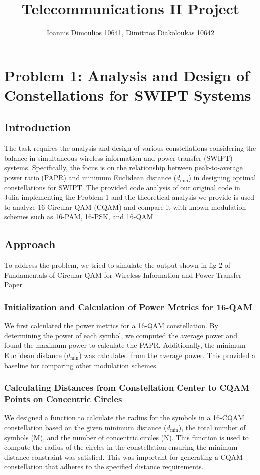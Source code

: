 \documentclass[11pt,a4paper,oneside]{article}
\title{Telecommunications II Project}
\author{Ioannis Dimoulios 10641, Dimitrios Diakoloukas 10642}
\begin{document}
\maketitle

\section{Problem 1: Analysis and Design of Constellations for SWIPT Systems}

\subsection{Introduction}
The task requires the analysis and design of various constellations considering the
balance in simultaneous wireless information and power transfer (SWIPT) systems.
Specifically, the focus is on the relationship between peak-to-average power ratio (PAPR)
and minimum Euclidean distance ($d_{\text{min}}$) in designing optimal constellations for SWIPT.
The provided code analysis of our original code in Julia implementing the Problem 1 and the theoretical
analysis we provide is used to analyze 16-Circular QAM (CQAM) and compare it with known modulation schemes such as 16-PAM, 16-PSK, and 16-QAM.

\subsection{Approach}
To address the problem, we tried to simulate the output shown in fig 2 of Fundamentals
of Circular QAM for Wireless Information and Power Transfer Paper

\subsubsection{Initialization and Calculation of Power Metrics for 16-QAM}
We first calculated the power metrics for a 16-QAM constellation.
By determining the power of each symbol, we computed the average power and found the maximum power to calculate the PAPR. Additionally, the minimum Euclidean distance ($d_{\text{min}}$)
was calculated from the average power. This provided a baseline for comparing other modulation schemes.

\subsubsection{Calculating Distances from Constellation Center to CQAM Points on Concentric Circles}
We designed a function to calculate the radius for the symbols
in a 16-CQAM constellation based on the given minimum distance ($d_{\text{min}}$), the total number of symbols (M),
and the number of concentric circles (N). This function is used to compute the radius of the circles in the constellation ensuring the minimum distance constraint was satisfied.
This was important for generating a CQAM constellation that adheres to the specified distance requirements.
\end{document}
